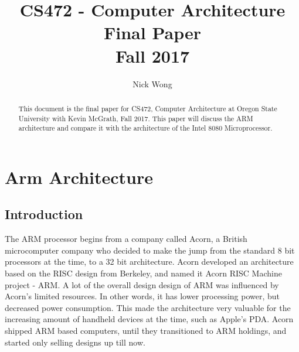 \documentclass[draftclsnofoot, onecolumn, 10pt, compsoc]{IEEEtran}
\title{\textbf{CS472 - Computer Architecture}\\Final Paper\\Fall 2017}
\author{Nick Wong}
\begin{document}
    \maketitle
    \begin{abstract}
        This document is the final paper for CS472, Computer Architecture at Oregon State University with Kevin McGrath, Fall 2017. This paper will discuss the ARM architecture and compare it with the architecture of the Intel 8080 Microprocessor.
    \end{abstract}
    \newpage
    
    \tableofcontents
    \newpage
    
    \section{Arm Architecture}
        \subsection{Introduction}
            The ARM processor begins from a company called Acorn, a British microcomputer company who decided to make the jump from the standard 8 bit processors at the time, to a 32 bit architecture. Acorn developed an architecture based on the RISC design from Berkeley, and named it Acorn RISC Machine project - ARM. A lot of the overall design design of ARM was influenced by Acorn’s limited resources. In other words, it has lower processing power, but decreased power consumption. This made the architecture very valuable for the increasing amount of handheld devices at the time, such as Apple’s PDA. Acorn shipped ARM based computers, until they transitioned to ARM holdings, and started only selling designs up till now. 
            ~\cite{ARM:All}
            ~\cite{ARM:Timeline}
\end{document}
